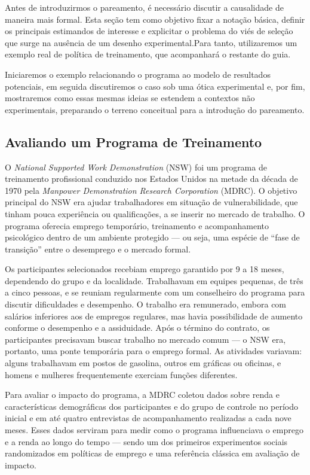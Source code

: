 Antes de introduzirmos o pareamento, é necessário discutir a causalidade de maneira mais formal. Esta seção tem como objetivo fixar a notação básica, definir os principais estimandos de interesse e explicitar o problema do viés de seleção que surge na ausência de um desenho experimental.Para tanto, utilizaremos um exemplo real de política de treinamento, que acompanhará o restante do guia.

Iniciaremos o exemplo relacionando o programa ao modelo de resultados potenciais, em seguida discutiremos o caso sob uma ótica experimental e, por fim, mostraremos como essas mesmas ideias se estendem a contextos não experimentais, preparando o terreno conceitual para a introdução do pareamento.

\subsection{Avaliando um Programa de Treinamento}

O \textit{National Supported Work Demonstration} (NSW) foi um programa de treinamento profissional conduzido nos Estados Unidos na metade da década de 1970 pela \textit{Manpower Demonstration Research Corporation} (MDRC). O objetivo principal do NSW era ajudar trabalhadores em situação de vulnerabilidade, que tinham pouca experiência ou qualificações, a se inserir no mercado de trabalho. O programa oferecia emprego temporário, treinamento e acompanhamento psicológico dentro de um ambiente protegido — ou seja, uma espécie de “fase de transição” entre o desemprego e o mercado formal.

Os participantes selecionados recebiam emprego garantido por 9 a 18 meses, dependendo do grupo e da localidade. Trabalhavam em equipes pequenas, de três a cinco pessoas, e se reuniam regularmente com um conselheiro do programa para discutir dificuldades e desempenho. O trabalho era remunerado, embora com salários inferiores aos de empregos regulares, mas havia possibilidade de aumento conforme o desempenho e a assiduidade. Após o término do contrato, os participantes precisavam buscar trabalho no mercado comum — o NSW era, portanto, uma ponte temporária para o emprego formal. As atividades variavam: alguns trabalhavam em postos de gasolina, outros em gráficas ou oficinas, e homens e mulheres frequentemente exerciam funções diferentes.


Para avaliar o impacto do programa, a MDRC coletou dados sobre renda e características demográficas dos participantes e do grupo de controle no período inicial e em até quatro entrevistas de acompanhamento realizadas a cada nove meses.
Esses dados serviram para medir como o programa influenciava o emprego e a renda ao longo do tempo — sendo um dos primeiros experimentos sociais randomizados em políticas de emprego e uma referência clássica em avaliação de impacto.

